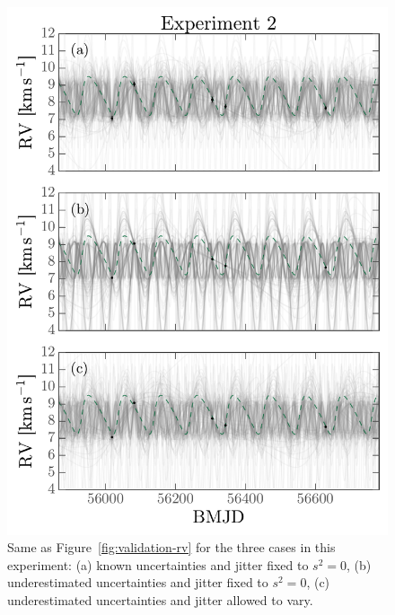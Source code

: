 \documentclass[manuscript, letterpaper]{aastex6}
\newcommand{\figname}{Figure}
\begin{document}
\begin{figure}[p]
\begin{center}
\includegraphics[width=\textwidth]{figures/undunc-rv-curves.pdf}
\end{center}
\caption{%
Same as \figname~\ref{fig:validation-rv} for the three cases in this experiment:
(a) known uncertainties and jitter fixed to $s^2 = 0$, (b) underestimated
uncertainties and jitter fixed to $s^2 = 0$, (c) underestimated uncertainties
and jitter allowed to vary.
\label{fig:undunc-rv}}
\end{figure}
\end{document}
